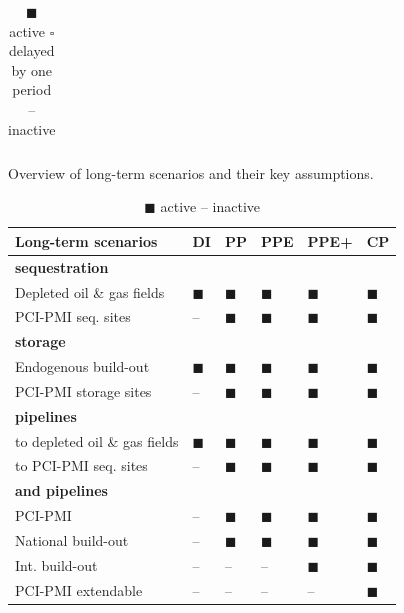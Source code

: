 \documentclass[preprint,12pt]{elsarticle}
\begin{document}
\begin{table}[htbp]
\begin{tabularx}{\textwidth}{R{3.9cm}>{\centering\arraybackslash}X>{\centering\arraybackslash}X>{\centering\arraybackslash}X}
    \bottomrule
  \end{tabularx}
  \caption*{\scriptsize $\blacksquare$ active \quad $\square$ delayed by one period \quad -- inactive}
\end{table}


\begin{table}[htbp]
  \centering
  \caption{Overview of long-term scenarios and their key assumptions.}
  \label{tab:long-term_scenarios}
  \scriptsize
  \begin{tabularx}{\textwidth}{R{3.9cm}>{\centering\arraybackslash}X>{\centering\arraybackslash}X>{\centering\arraybackslash}X>{\centering\arraybackslash}X>{\centering\arraybackslash}X}
    \toprule
    \textbf{Long-term scenarios} & 
    \textbf{DI} & 
    \textbf{PP} & 
    \textbf{PPE} & 
    \textbf{PPE+} & 
    \textbf{CP} \\
    \midrule
    \textbf{ sequestration} & & & & & \\
    Depleted oil \& gas fields & $\blacksquare$ & $\blacksquare$ & $\blacksquare$ & $\blacksquare$ & $\blacksquare$ \\
    PCI-PMI seq. sites & -- & $\blacksquare$ & $\blacksquare$ & $\blacksquare$ & $\blacksquare$ \\
    \midrule
    \textbf{ storage} & & & & & \\
    Endogenous build-out & $\blacksquare$ & $\blacksquare$ & $\blacksquare$ & $\blacksquare$ & $\blacksquare$ \\
    PCI-PMI  storage sites & -- & $\blacksquare$ & $\blacksquare$ & $\blacksquare$ & $\blacksquare$ \\
    \midrule
    \textbf{ pipelines} & & & & & \\
    to depleted oil \& gas fields & $\blacksquare$ & $\blacksquare$ & $\blacksquare$ & $\blacksquare$ & $\blacksquare$ \\
    to PCI-PMI seq. sites & -- & $\blacksquare$ & $\blacksquare$ & $\blacksquare$ & $\blacksquare$ \\
    \midrule
    \textbf{ and  pipelines} & & & & & \\
    PCI-PMI & -- & $\blacksquare$ & $\blacksquare$ & $\blacksquare$ & $\blacksquare$ \\
    National build-out & -- & $\blacksquare$ & $\blacksquare$ & $\blacksquare$ & $\blacksquare$ \\
    Int. build-out & -- & -- & -- & $\blacksquare$ & $\blacksquare$ \\
    PCI-PMI extendable & -- & -- & -- & -- & $\blacksquare$ \\

    \bottomrule
  \end{tabularx}
  \caption*{\scriptsize $\blacksquare$ active \quad -- inactive}
\end{table}
\end{document}
